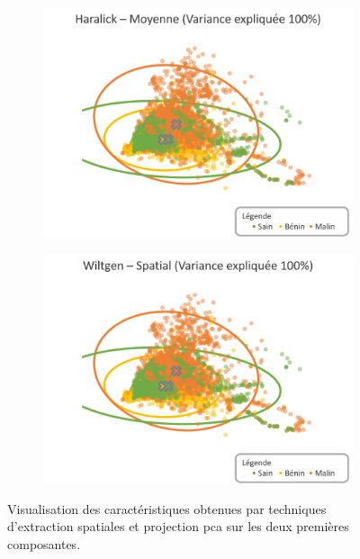 \begin{figure}[H]
    \begin{subfigure}{.49\textwidth}
      \includegraphics[width=\textwidth]{contents/chapter_5/resources/visualisation_spatial_HaralickMean.png}
    \end{subfigure}
    \begin{subfigure}{.49\textwidth}
      \includegraphics[width=\textwidth]{contents/chapter_5/resources/visualisation_spatial_WiltgenSpatial.png}
    \end{subfigure}
    
    \caption{Visualisation des caractéristiques obtenues par techniques d'extraction spatiales et projection \gls{pca} sur les deux premières composantes.}
    \label{fig:visualisation_spatial}
\end{figure}\par

